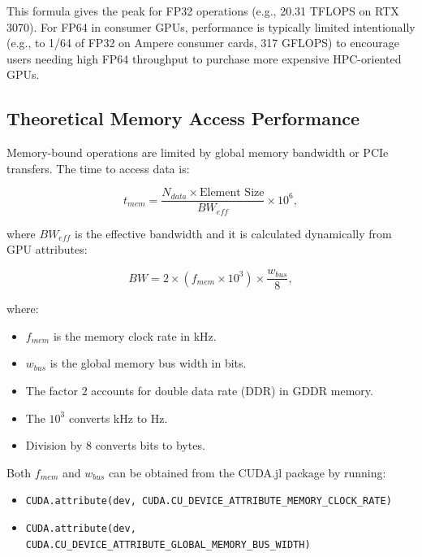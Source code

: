 This formula gives the peak for FP32 operations (e.g., 20.31 TFLOPS on RTX 3070). For FP64 in consumer GPUs, performance is typically limited intentionally (e.g., to 1/64 of FP32 on Ampere consumer cards, 317 GFLOPS) to encourage users needing high FP64 throughput to purchase more expensive HPC-oriented GPUs.

\clearpage

\subsection*{Theoretical Memory Access Performance}

Memory-bound operations are limited by global memory bandwidth or PCIe transfers. The time to access data is:

\begin{equation}
t_{mem} = \frac{N_{data} \times \text{Element Size}}{BW_{eff}} \times 10^6,
\end{equation}

where $BW_{eff}$ is the effective bandwidth and it is calculated dynamically from GPU attributes:

\begin{equation}
BW = 2 \times (f_{mem} \times 10^3) \times \frac{w_{bus}}{8},
\end{equation}

where:

\begin{itemize}
    \item $f_{mem}$ is the memory clock rate in kHz.
    \item $w_{bus}$ is the global memory bus width in bits.
    \item The factor $2$ accounts for double data rate (DDR) in GDDR memory.
    \item The $10^3$ converts kHz to Hz.
    \item Division by $8$ converts bits to bytes.
\end{itemize}

Both $f_{mem}$ and $w_{bus}$ can be obtained from the CUDA.jl package by running:

\begin{itemize}
    \item \texttt{CUDA.attribute(dev, CUDA.CU\_DEVICE\_ATTRIBUTE\_MEMORY\_CLOCK\_RATE)}
    \item \texttt{CUDA.attribute(dev, CUDA.CU\_DEVICE\_ATTRIBUTE\_GLOBAL\_MEMORY\_BUS\_WIDTH)}
\end{itemize}

